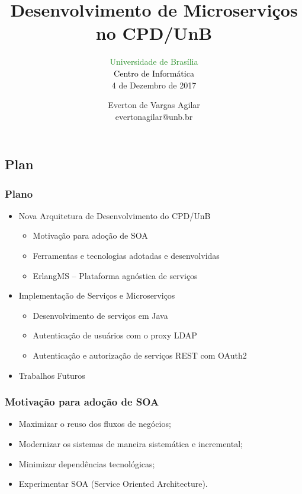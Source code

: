 \documentclass{beamer}
\title{Desenvolvimento de Microserviços \\ no CPD/UnB }
\subtitle{ \textcolor{forestgreen}{Universidade de Brasília} \\
			\textcolor{black}{Centro de Informática} \\
			4 de Dezembro de 2017
}
\author{Everton de Vargas Agilar \\
		evertonagilar@unb.br
}
\begin{document}
\begin{frame}
  \titlepage
\end{frame}








\subsection{Plan}

\begin{frame}
  \frametitle{Plano}

    \begin{itemize}

	    \item<1-> Nova Arquitetura de Desenvolvimento do CPD/UnB
		    \begin{itemize}
				\item<1->Motivação para adoção de SOA
				\item<1->Ferramentas e tecnologias adotadas e desenvolvidas
				\item<1->ErlangMS -- Plataforma agnóstica de serviços
			\end{itemize}

  	  	\item<1-> Implementação de Serviços e Microserviços
		    \begin{itemize}
				\item<1->Desenvolvimento de serviços em Java
				\item<1->Autenticação de usuários com o proxy LDAP
				\item<1->Autenticação e autorização de serviços REST com OAuth2
  		     \end{itemize}
 	  
	   	\item<1-> Trabalhos Futuros
	   	  
    \end{itemize}

\end{frame}



\begin{frame}
\frametitle{Motivação para adoção de SOA}

\begin{itemize}
	\item<1->Maximizar o reuso dos fluxos de negócios;
	\item<1->Modernizar os sistemas de maneira sistemática e incremental;
	\item<1->Minimizar dependências tecnológicas; 
	\item<1->Experimentar SOA (Service Oriented Architecture).
\end{itemize}

\end{frame}
\end{document}
